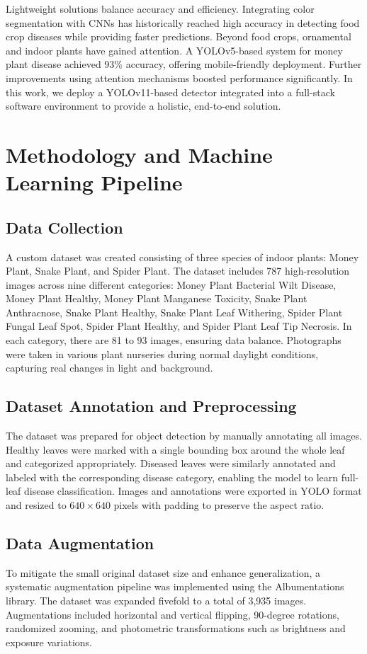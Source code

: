 \documentclass[12pt, a4paper]{article}
\begin{document}
Lightweight solutions balance accuracy and efficiency. Integrating color segmentation with CNNs has historically reached high accuracy in detecting food crop diseases while providing faster predictions. Beyond food crops, ornamental and indoor plants have gained attention. A YOLOv5-based system for money plant disease achieved 93\% accuracy, offering mobile-friendly deployment. Further improvements using attention mechanisms boosted performance significantly. In this work, we deploy a YOLOv11-based detector integrated into a full-stack software environment to provide a holistic, end-to-end solution.

\section{Methodology and Machine Learning Pipeline}
\subsection{Data Collection}
A custom dataset was created consisting of three species of indoor plants: Money Plant, Snake Plant, and Spider Plant. The dataset includes 787 high-resolution images across nine different categories: Money Plant Bacterial Wilt Disease, Money Plant Healthy, Money Plant Manganese Toxicity, Snake Plant Anthracnose, Snake Plant Healthy, Snake Plant Leaf Withering, Spider Plant Fungal Leaf Spot, Spider Plant Healthy, and Spider Plant Leaf Tip Necrosis. In each category, there are 81 to 93 images, ensuring data balance. Photographs were taken in various plant nurseries during normal daylight conditions, capturing real changes in light and background.

\subsection{Dataset Annotation and Preprocessing}
The dataset was prepared for object detection by manually annotating all images. Healthy leaves were marked with a single bounding box around the whole leaf and categorized appropriately. Diseased leaves were similarly annotated and labeled with the corresponding disease category, enabling the model to learn full-leaf disease classification. Images and annotations were exported in YOLO format and resized to $640 \times 640$ pixels with padding to preserve the aspect ratio.

\subsection{Data Augmentation}
To mitigate the small original dataset size and enhance generalization, a systematic augmentation pipeline was implemented using the Albumentations library. The dataset was expanded fivefold to a total of 3,935 images. Augmentations included horizontal and vertical flipping, 90-degree rotations, randomized zooming, and photometric transformations such as brightness and exposure variations. 
\end{document}
